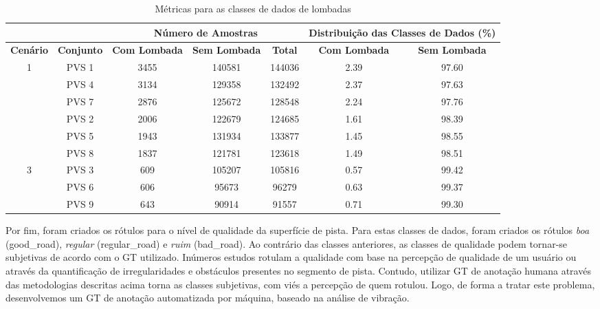 \begin{table}[H]
\scriptsize
\centering
\caption{Métricas para as classes de dados de lombadas} 
\label{table:lombada_metricas}
\begin{tabular}{ccccccc}
\cmidrule(l){3-7}
\multicolumn{1}{l}{} & 
\multicolumn{1}{l}{} & 
\multicolumn{3}{c}{\textbf{Número de Amostras}} & 
\multicolumn{2}{c}{\textbf{Distribuição das Classes de Dados (\%)}} \\ \midrule
\textbf{Cenário} & 
\textbf{Conjunto} & 
\textbf{Com Lombada} & 
\textbf{Sem Lombada} & 
\textbf{Total} & 
\textbf{Com Lombada} & 
\textbf{Sem Lombada} \\ \midrule

\multirow{4}{*}{1} & PVS 1 & 3455 & 140581 & 144036 & 2.39 & 97.60 \\ \cmidrule(l){2-7} 
 & PVS 4 & 3134 & 129358 & 132492 & 2.37 & 97.63 \\ \cmidrule(l){2-7} 
 & PVS 7 & 2876 & 125672 & 128548 & 2.24 & 97.76 \\ \midrule
 
\multirow{4}{*}{2} & PVS 2 & 2006 & 122679 & 124685 & 1.61 & 98.39 \\ \cmidrule(l){2-7} 
 & PVS 5 & 1943 & 131934 & 133877 & 1.45 & 98.55 \\ \cmidrule(l){2-7} 
 & PVS 8 & 1837 & 121781 & 123618 & 1.49 & 98.51 \\ \midrule
 
\multirow{4}{*}{3} & PVS 3 & 609 & 105207 & 105816 & 0.57 & 99.42 \\ \cmidrule(l){2-7} 
 & PVS 6 & 606 & 95673 & 96279 & 0.63 & 99.37 \\ \cmidrule(l){2-7} 
 & PVS 9 & 643 & 90914 & 91557 & 0.71 & 99.30 \\ \bottomrule
\end{tabular}
\end{table}

Por fim, foram criados os rótulos para o nível de qualidade da superfície de pista. Para estas classes de dados, foram criados os rótulos \emph{boa} (good\_road), \emph{regular} (regular\_road) e \emph{ruim} (bad\_road). Ao contrário das classes anteriores, as classes de qualidade podem tornar-se subjetivas de acordo com o GT utilizado. Inúmeros estudos rotulam a qualidade com base na percepção de qualidade de um usuário ou através da quantificação de irregularidades e obstáculos presentes no segmento de pista. Contudo, utilizar GT de anotação humana através das metodologias descritas acima torna as classes subjetivas, com viés a percepção de quem rotulou. Logo, de forma a tratar este problema, desenvolvemos um GT de anotação automatizada por máquina, baseado na análise de vibração.

